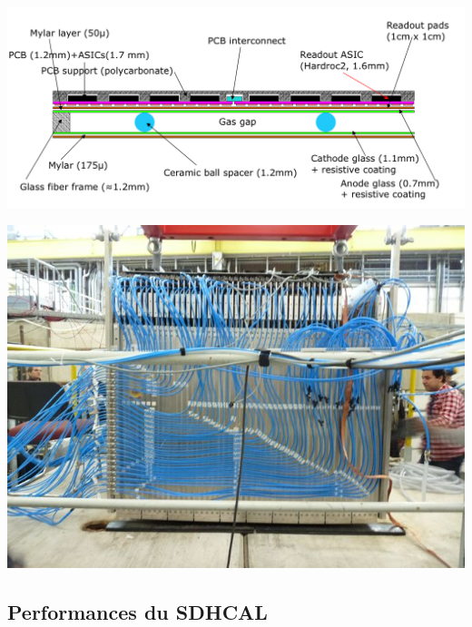 \documentclass[8pt]{beamer}
\begin{document}
\begin{frame}
\begin{minipage}{0.46\linewidth}
    \end{minipage}
    \begin{minipage}{0.58\linewidth}
      \begin{center}
        \includegraphics[width=0.9\linewidth]{figs/GRPC-K7.png}
      \end{center}
    \end{minipage} \hfill
    \begin{minipage}{0.4\linewidth}
      \begin{center}
        \includegraphics[width=0.7\linewidth]{figs/sdhcal_testbeam.jpg}
      \end{center}
    \end{minipage}
  \end{frame}


  \subsection{Performances du SDHCAL}
\end{document}
